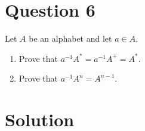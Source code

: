 \section*{Question 6}

Let $A$ be an alphabet and let $a \in A$.

\begin{enumerate}[label=(\alph*)]

	\item
	Prove that $a^{-1}A^* = a^{-1}A^+ = A^*$.

	\item
	Prove that $a^{-1}A^n = A^{n-1}$.

\end{enumerate}

\section*{Solution}

